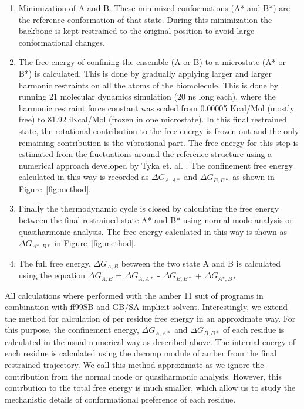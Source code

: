 \documentclass[12pt]{article}
\begin{document}
\begin{enumerate}

\item  Minimization of A and B. These minimized conformations (A* and B*)
       are the reference conformation of that state. During this minimization the backbone is kept
       restrained to the original position to avoid large conformational changes.

   \item  The free energy of confining the ensemble (A or B) to a microstate (A* or B*) is
       calculated. This is done by gradually applying larger and larger
       harmonic restraints on all the atoms of the biomolecule. This is done by running 21 molecular dynamics simulation 
       (20 ns long each), where the harmonic restraint force constant was scaled from 0.00005
       Kcal/Mol 
       (mostly free) to 81.92 iKcal/Mol (frozen in one microstate). In this final restrained state, the
       rotational contribution to the free energy is frozen out
       and the only remaining contribution is the vibrational part. The free energy for this step is
       estimated from the fluctuations around
       the reference structure using a numerical
       approach developed by Tyka et. al. \cite{Tyka2006}. The confinement free energy calculated in
       this way is recorded as 
       $\Delta G_{A,A*}$ and $\Delta G_{B,B*}$ as shown in Figure~\ref{fig:method}.     

\item  Finally the thermodynamic cycle is closed by calculating the free energy between the final
       restrained state A* and B* using normal mode analysis or quasiharmonic analysis. The free energy calculated in 
       this way is shown as $\Delta G_{A*,B*}$ in Figure~\ref{fig:method}.

\item  The full free energy, $\Delta G_{A,B}$ between the two state A and B is calculated using the equation 
       $\Delta G_{A,B}$ = $\Delta G_{A,A*}$ - $\Delta G_{B,B*}$ + $\Delta G_{A*,B*}$  

\end{enumerate}

All calculations where performed with the amber 11 suit of programs in combination with ff99SB and
GB/SA implicit solvent. Interestingly, we extend the method for calculation of per residue free
energy in an approximate way. For this purpose, the confinement energy, $\Delta G_{A,A*}$ and
$\Delta G_{B,B*}$ of each residue is calculated in the usual numerical way as described above. The
internal energy of each residue is calculated using the decomp module of amber from the final
restrained trajectory. We call this method approximate as we ignore the contribution from the normal
mode or quasiharmonic analysis. However, this contrbution to the total free energy is much smaller, 
which allow us to study the mechanistic details of conformational preference of each residue.      
\end{document}
